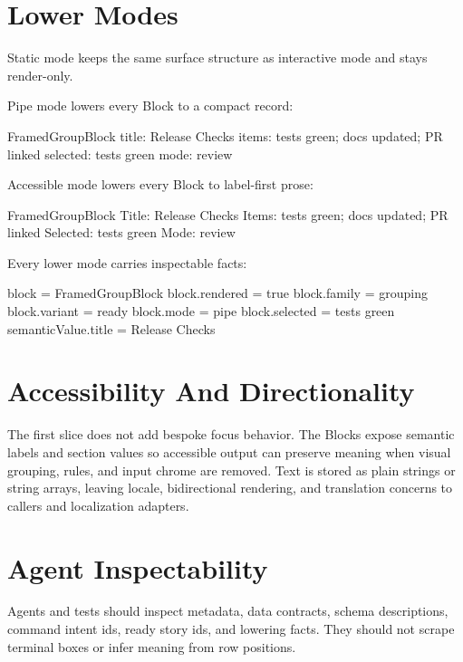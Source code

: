 \section{Lower Modes}\label{record-094-lower-modes}

Static mode keeps the same surface structure as interactive mode and stays render-only.

Pipe mode lowers every Block to a compact record:

\begin{CodeBlock}
FramedGroupBlock
title: Release Checks
items: tests green; docs updated; PR linked
selected: tests green
mode: review
\end{CodeBlock}

Accessible mode lowers every Block to label-first prose:

\begin{CodeBlock}
FramedGroupBlock
Title: Release Checks
Items: tests green; docs updated; PR linked
Selected: tests green
Mode: review
\end{CodeBlock}

Every lower mode carries inspectable facts:

\begin{CodeBlock}
block = FramedGroupBlock
block.rendered = true
block.family = grouping
block.variant = ready
block.mode = pipe
block.selected = tests green
semanticValue.title = Release Checks
\end{CodeBlock}

\section{Accessibility And Directionality}\label{record-094-accessibility-and-directionality}

The first slice does not add bespoke focus behavior. The Blocks expose semantic labels and section values so accessible output can preserve meaning when visual grouping, rules, and input chrome are removed. Text is stored as plain strings or string arrays, leaving locale, bidirectional rendering, and translation concerns to callers and localization adapters.

\section{Agent Inspectability}\label{record-094-agent-inspectability}

Agents and tests should inspect metadata, data contracts, schema descriptions, command intent ids, ready story ids, and lowering facts. They should not scrape terminal boxes or infer meaning from row positions.

